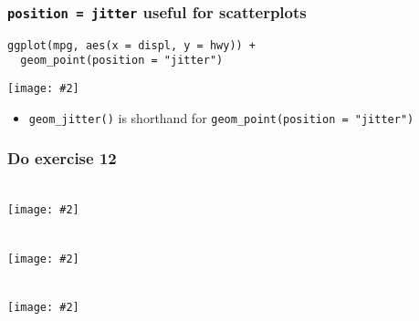 \documentclass{beamer}
\newcommand{\bi}{\begin{itemize}}
\newcommand{\li}{\item}
\newcommand{\ei}{\end{itemize}}
\newcommand{\fig}[2]{\centerline{\texttt{[image: \#2]}}}
\newcommand{\bfr}[1]{\begin{frame}[fragile]\frametitle{{ #1 }}}
\begin{document}
\bfr{{\tt position = jitter} useful for scatterplots}\scriptsize
\begin{verbatim}
ggplot(mpg, aes(x = displ, y = hwy)) + 
  geom_point(position = "jitter")
\end{verbatim}
\fig{.8}{unnamed-chunk-39-1.png}
\bi
\li \verb|geom_jitter()| is shorthand for \verb|geom_point(position = "jitter")|
\ei
\end{frame}

\bfr{Do exercise 12}
\end{frame}

\bfr{}\scriptsize
\begin{verbatim}

\end{verbatim}
\fig{.7}{unnamed-chunk-35-1.png}
\end{frame}


\bfr{}\scriptsize
\begin{verbatim}

\end{verbatim}
\fig{.7}{unnamed-chunk-35-1.png}
\end{frame}


\bfr{}\scriptsize
\begin{verbatim}

\end{verbatim}
\fig{.7}{unnamed-chunk-35-1.png}
\end{frame}
\end{document}
